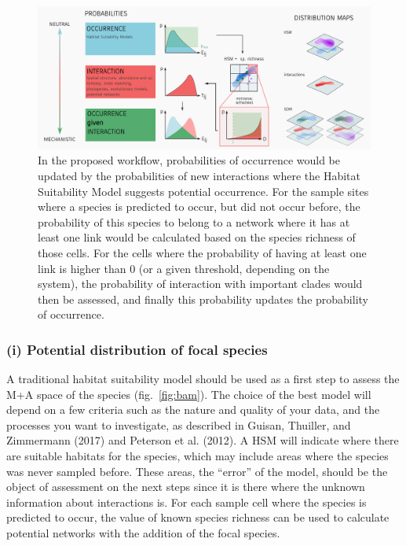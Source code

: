\documentclass[12pt]{article}
\makeatletter
\def\maxwidth{\ifdim\Gin@nat@width>\linewidth\linewidth
\else\Gin@nat@width\fi}
\let\Oldincludegraphics\includegraphics
\renewcommand{\includegraphics}[1]{\Oldincludegraphics[width=\maxwidth]{#1}}
\makeatother
\begin{document}
\begin{figure}
\hypertarget{fig:synthesis}{%
\centering
\includegraphics{figures/conc_fig4_chapX.png}
\caption{In the proposed workflow, probabilities of occurrence would be
updated by the probabilities of new interactions where the Habitat
Suitability Model suggests potential occurrence. For the sample sites
where a species is predicted to occur, but did not occur before, the
probability of this species to belong to a network where it has at least
one link would be calculated based on the species richness of those
cells. For the cells where the probability of having at least one link
is higher than 0 (or a given threshold, depending on the system), the
probability of interaction with important clades would then be assessed,
and finally this probability updates the probability of
occurrence.}\label{fig:synthesis}
}
\end{figure}

\hypertarget{i-potential-distribution-of-focal-species}{%
\subsubsection{(i) Potential distribution of focal
species}\label{i-potential-distribution-of-focal-species}}

A traditional habitat suitability model should be used as a first step
to assess the M+A space of the species (fig.~\ref{fig:bam}). The choice
of the best model will depend on a few criteria such as the nature and
quality of your data, and the processes you want to investigate, as
described in Guisan, Thuiller, and Zimmermann (2017) and Peterson et al.
(2012). A HSM will indicate where there are suitable habitats for the
species, which may include areas where the species was never sampled
before. These areas, the ``error'' of the model, should be the object of
assessment on the next steps since it is there where the unknown
information about interactions is. For each sample cell where the
species is predicted to occur, the value of known species richness can
be used to calculate potential networks with the addition of the focal
species.
\end{document}
